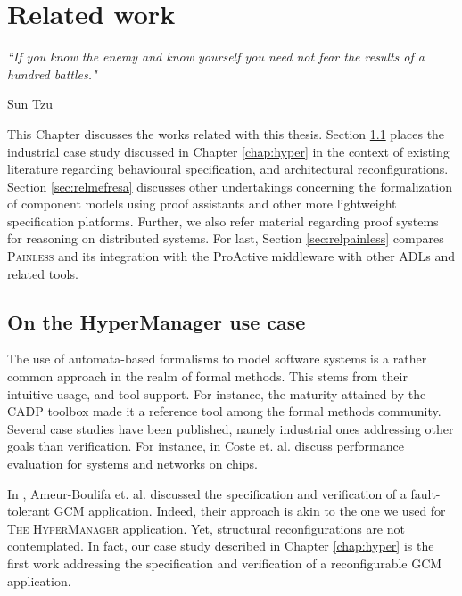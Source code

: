 
\chapter{Related work} 
\label{chap:related} 


\epigraph{\textit{“If you know the enemy and know yourself you need 
                             not fear the results of a hundred battles."}}{Sun Tzu}

\minitoc



		This Chapter discusses the works related with this thesis. Section \ref{sec:relhyper} places the industrial
	case study discussed in Chapter \ref{chap:hyper} in the context of existing literature regarding behavioural
	specification, and architectural reconfigurations. Section \ref{sec:relmefresa} discusses other undertakings concerning the formalization
	of component models using proof assistants and other more lightweight specification platforms. Further,
	we also refer material regarding proof systems for reasoning on distributed systems.
	For last, Section \ref{sec:relpainless} compares \textsc{Painless} and its integration with the ProActive middleware
	with other \ac{ADL}s and related tools.
	

\section{On the HyperManager use case}
\label{sec:relhyper}

	
	
	The use of automata-based formalisms to model software systems is a rather common
	approach in the realm of formal methods. This stems from their intuitive usage,
	and tool support. For instance, the maturity attained by the CADP toolbox \cite{garavel:inria-00583776}
		made it a reference tool among the formal methods community.  Several case studies have been published, 
		namely industrial ones addressing other goals than verification. For instance, in \cite{conf/cav/CosteHLS09}
	Coste et. al. discuss performance evaluation for systems and networks on chips. 
	
	In \cite{BHHM:FACS11}, Ameur-Boulifa et. al. discussed the specification and verification
	of a fault-tolerant \ac{GCM} application. Indeed, their approach is akin to the one
	we used for \textsc{The HyperManager} application. Yet, structural reconfigurations
	are not contemplated. In fact, our case study described in Chapter \ref{chap:hyper}
	is the first work addressing the specification and verification of a 
	reconfigurable \ac{GCM} application.
	

